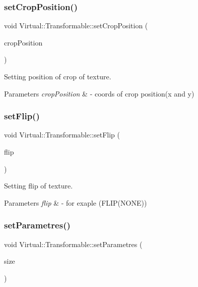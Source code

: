\subsubsection{\texorpdfstring{set\+Crop\+Position()}{setCropPosition()}}
{\footnotesize\ttfamily void Virtual\+::\+Transformable\+::set\+Crop\+Position (\begin{DoxyParamCaption}\item[{\hyperlink{struct_virtual_1_1_vector2}{Vector2}$<$ int $>$}]{crop\+Position }\end{DoxyParamCaption})}



Setting position of crop of texture. 


\begin{DoxyParams}{Parameters}
{\em crop\+Position} & -\/ coords of crop position(x and y) \\
\hline
\end{DoxyParams}
\hypertarget{class_virtual_1_1_transformable_a4d0e9c61931af6b42fac1dc0c3a1ed21}{}\label{class_virtual_1_1_transformable_a4d0e9c61931af6b42fac1dc0c3a1ed21} 
\subsubsection{\texorpdfstring{set\+Flip()}{setFlip()}}
{\footnotesize\ttfamily void Virtual\+::\+Transformable\+::set\+Flip (\begin{DoxyParamCaption}\item[{S\+D\+L\+\_\+\+Renderer\+Flip}]{flip }\end{DoxyParamCaption})}



Setting flip of texture. 


\begin{DoxyParams}{Parameters}
{\em flip} & -\/ for exaple (F\+L\+I\+P(\+N\+O\+N\+E)) \\
\hline
\end{DoxyParams}
\hypertarget{class_virtual_1_1_transformable_a67d42e58b8f2fc45b565aa51e3f29f67}{}\label{class_virtual_1_1_transformable_a67d42e58b8f2fc45b565aa51e3f29f67} 
\subsubsection{\texorpdfstring{set\+Parametres()}{setParametres()}}
{\footnotesize\ttfamily void Virtual\+::\+Transformable\+::set\+Parametres (\begin{DoxyParamCaption}\item[{\hyperlink{struct_virtual_1_1_vector2}{Vector2}$<$ int $>$}]{size }\end{DoxyParamCaption})}



